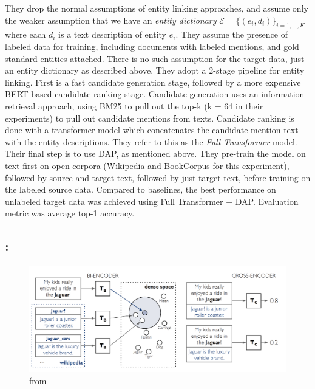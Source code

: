 \documentclass{article}
\begin{document}
They drop the normal assumptions of entity linking approaches, and assume only the weaker assumption that we have an \emph{entity dictionary} $\mathcal{E} = \{(e_i,d_i)\}_{i = 1,...,K}$ where each $d_i$ is a text description of entity $e_i$. They assume the presence of labeled data for training, including documents with labeled mentions, and gold standard entities attached. There is no such assumption for the target data, just an entity dictionary as described above. They adopt a 2-stage pipeline for entity linking. First is a fast candidate generation stage, followed by a more expensive BERT-based candidate ranking stage. Candidate generation uses an information retrieval approach, using BM25 to pull out the top-k (k = 64 in their experiments) to pull out candidate mentions from texts. Candidate ranking is done with a transformer model which concatenates the candidate mention text with the entity descriptions. They refer to this as the \emph{Full Transformer} model. Their final step is to use DAP, as mentioned above. They pre-train the model on text first on open corpora (Wikipedia and BookCorpus for this experiment), followed by source and target text, followed by just target text, before training on the labeled source data. Compared to baselines, the best performance on unlabeled target data was achieved using Full Transformer + DAP. Evaluation metric was average top-1 accuracy.


\subsection{\cite{wu_scalable_2020}: }


\begin{figure}
\centering
\includegraphics[scale=0.33]{zero-shot-fig-1}
\caption{from \cite{wu_scalable_2020}}
\label{fig:zero-shot}
\end{figure}
\end{document}
